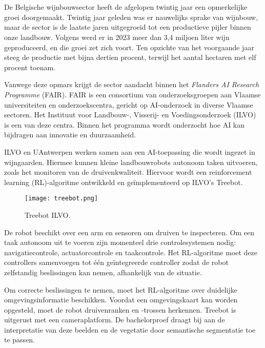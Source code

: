 
\chapter{}%
\label{ch:inleiding}

De Belgische wijnbouwsector heeft de afgelopen twintig jaar een opmerkelijke groei doorgemaakt.  Twintig jaar geleden was er nauwelijks sprake van wijnbouw, maar de sector is de laatste jaren uitgegroeid tot een productieve pijler binnen onze landbouw. Volgens \textcite{FODEconomie2024} werd er in 2023 meer dan 3,4 miljoen liter wijn geproduceerd, en die groei zet zich voort. Ten opzichte van het voorgaande jaar steeg de productie met bijna dertien procent, terwijl het aantal hectaren met elf procent toenam. 

Vanwege deze opmars krijgt de sector aandacht binnen het \textit{Flanders AI Research Programme} (FAIR). FAIR is een consortium van onderzoeksgroepen aan Vlaamse universiteiten en onderzoekscentra, gericht op AI-onderzoek in diverse Vlaamse sectoren. Het Instituut voor Landbouw-, Visserij- en Voedingsonderzoek (ILVO) is een van deze centra. Binnen het programma wordt onderzocht hoe AI kan bijdragen aan innovatie en duurzaamheid.

ILVO en UAntwerpen werken samen aan een AI-toepassing die wordt ingezet in wijngaarden. Hiermee kunnen kleine landbouwrobots autonoom taken uitvoeren, zoals het monitoren van de druivenkwaliteit. Hiervoor wordt een reinforcement learning (RL)-algoritme ontwikkeld en geïmplementeerd op ILVO's Treebot. \begin{figure}
    \centering
    \texttt{[image: treebot.png]}
    \caption[Treebot ILVO.]{\label{fig:treebot}Treebot ILVO.}
\end{figure}

De robot beschikt over een arm en sensoren om druiven te inspecteren. Om een taak autonoom uit te voeren zijn momenteel drie controlesystemen nodig: navigatiecontrole, actuatorcontrole en taakcontrole. Het RL-algoritme moet deze controllers samenvoegen tot één geïntegreerde controller zodat de robot zelfstandig beslissingen kan nemen, afhankelijk van de situatie.

Om correcte beslissingen te nemen, moet het RL-algoritme over duidelijke omgevingsinformatie beschikken. Voordat een omgevingskaart kan worden opgesteld, moet de robot druivenranken en -trossen herkennen. Treebot is uitgerust met een cameraplatform. De bachelorproef draagt bij aan de interpretatie van deze beelden en de vegetatie door semantische segmentatie toe te passen.

